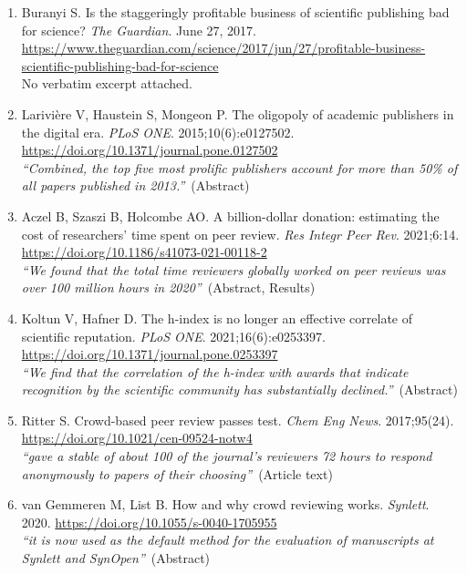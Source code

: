 \documentclass[12pt]{article}
\begin{document}
{\begin{enumerate}[leftmargin=1.8em,itemsep=5pt,topsep=0pt,label=\arabic*.]
\item \hypertarget{ref-buranyi2017}{}Buranyi S. Is the staggeringly profitable business of scientific publishing bad for science? \textit{The Guardian}. June 27, 2017. \url{https://www.theguardian.com/science/2017/jun/27/profitable-business-scientific-publishing-bad-for-science}\\[1pt]{\color{quote}\footnotesize No verbatim excerpt attached.}
\item \hypertarget{ref-lariviere2015}{}Larivi\`{e}re V, Haustein S, Mongeon P. The oligopoly of academic publishers in the digital era. \textit{PLoS ONE}. 2015;10(6):e0127502. \url{https://doi.org/10.1371/journal.pone.0127502}\\[1pt]{\color{quote}\itshape ``Combined, the top five most prolific publishers account for more than 50\% of all papers published in 2013.''}~{\color{quote}\footnotesize(Abstract)}
\item \hypertarget{ref-aczel2021}{}Aczel B, Szaszi B, Holcombe AO. A billion-dollar donation: estimating the cost of researchers' time spent on peer review. \textit{Res Integr Peer Rev}. 2021;6:14. \url{https://doi.org/10.1186/s41073-021-00118-2}\\[1pt]{\color{quote}\itshape ``We found that the total time reviewers globally worked on peer reviews was over 100 million hours in 2020''}~{\color{quote}\footnotesize(Abstract, Results)}
\item \hypertarget{ref-koltun2021}{}Koltun V, Hafner D. The h-index is no longer an effective correlate of scientific reputation. \textit{PLoS ONE}. 2021;16(6):e0253397. \url{https://doi.org/10.1371/journal.pone.0253397}\\[1pt]{\color{quote}\itshape ``We find that the correlation of the h-index with awards that indicate recognition by the scientific community has substantially declined.''}~{\color{quote}\footnotesize(Abstract)}
\item \hypertarget{ref-ritter2017}{}Ritter S. Crowd-based peer review passes test. \textit{Chem Eng News}. 2017;95(24). \url{https://doi.org/10.1021/cen-09524-notw4}\\[1pt]{\color{quote}\itshape ``gave a stable of about 100 of the journal's reviewers 72 hours to respond anonymously to papers of their choosing''}~{\color{quote}\footnotesize(Article text)}
\item \hypertarget{ref-vangemmeren2020}{}van Gemmeren M, List B. How and why crowd reviewing works. \textit{Synlett}. 2020. \url{https://doi.org/10.1055/s-0040-1705955}\\[1pt]{\color{quote}\itshape ``it is now used as the default method for the evaluation of manuscripts at Synlett and SynOpen''}~{\color{quote}\footnotesize(Abstract)}

\end{enumerate}}
\end{document}
